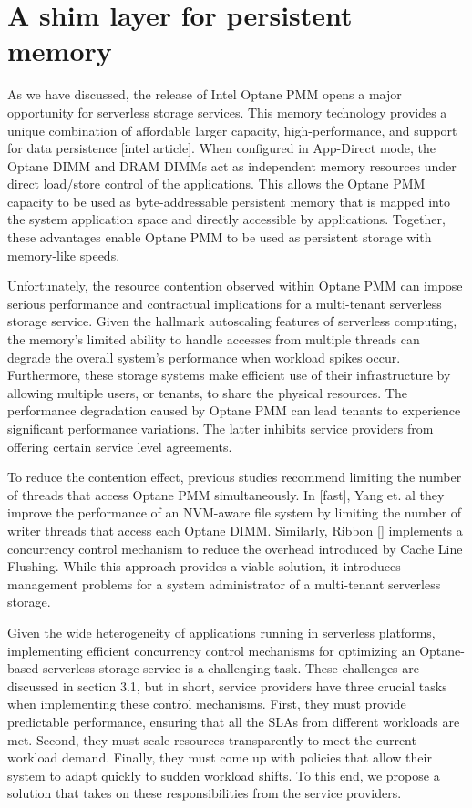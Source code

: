 \chapter[A shim Layer for persistent memory]{A shim layer for persistent memory}

As we have discussed, the release of Intel Optane PMM opens a major opportunity for serverless storage services. This memory technology provides a unique combination of affordable larger capacity, high-performance, and support for data persistence [intel article]. When configured in App-Direct mode, the Optane DIMM and DRAM DIMMs act as independent memory resources under direct load/store control of the applications. This allows the Optane PMM capacity to be used as byte-addressable persistent memory that is mapped into the system application space and directly accessible by applications. Together, these advantages enable Optane PMM to be used as persistent storage with memory-like speeds.

Unfortunately, the resource contention observed within Optane PMM can impose serious performance and contractual implications for a multi-tenant serverless storage service. Given the hallmark autoscaling features of serverless computing, the memory’s limited ability to handle accesses from multiple threads can degrade the overall system’s performance when workload spikes occur. Furthermore, these storage systems make efficient use of their infrastructure by allowing multiple users, or tenants, to share the physical resources. The performance degradation caused by Optane PMM can lead tenants to experience significant performance variations. The latter inhibits service providers from offering certain service level agreements.

To reduce the contention effect, previous studies recommend limiting the number of threads that access Optane PMM simultaneously. In [fast], Yang et. al they improve the performance of an NVM-aware file system by limiting the number of writer threads that access each Optane DIMM. Similarly, Ribbon [] implements a concurrency control mechanism to reduce the overhead introduced by Cache Line Flushing. While this approach provides a viable solution, it introduces management problems for a system administrator of a multi-tenant serverless storage.

Given the wide heterogeneity of applications running in serverless platforms, implementing efficient concurrency control mechanisms for optimizing an Optane-based serverless storage service is a challenging task. These challenges are discussed in section 3.1, but in short, service providers have three crucial tasks when implementing these control mechanisms. First, they must provide predictable performance, ensuring that all the SLAs from different workloads are met. Second, they must scale resources transparently to meet the current workload demand. Finally, they must come up with policies that allow their system to adapt quickly to sudden workload shifts. To this end, we propose a solution that takes on these responsibilities from the service providers.

